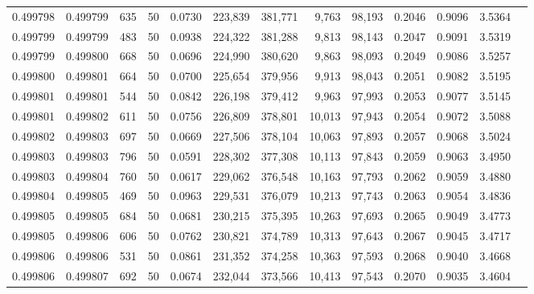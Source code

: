\begin{tabular}{rrrrrrrrrrrrr}
0.499798 & 0.499799 &   635 &  50 &                                     0.0730 & 223,839 & 381,771 &   9,763 &  98,193 & 0.2046 & 0.9096 & 3.5364 \\
0.499799 & 0.499799 &   483 &  50 &                                     0.0938 & 224,322 & 381,288 &   9,813 &  98,143 & 0.2047 & 0.9091 & 3.5319 \\
0.499799 & 0.499800 &   668 &  50 &                                     0.0696 & 224,990 & 380,620 &   9,863 &  98,093 & 0.2049 & 0.9086 & 3.5257 \\
0.499800 & 0.499801 &   664 &  50 &                                     0.0700 & 225,654 & 379,956 &   9,913 &  98,043 & 0.2051 & 0.9082 & 3.5195 \\
0.499801 & 0.499801 &   544 &  50 &                                     0.0842 & 226,198 & 379,412 &   9,963 &  97,993 & 0.2053 & 0.9077 & 3.5145 \\
0.499801 & 0.499802 &   611 &  50 &                                     0.0756 & 226,809 & 378,801 &  10,013 &  97,943 & 0.2054 & 0.9072 & 3.5088 \\
0.499802 & 0.499803 &   697 &  50 &                                     0.0669 & 227,506 & 378,104 &  10,063 &  97,893 & 0.2057 & 0.9068 & 3.5024 \\
0.499803 & 0.499803 &   796 &  50 &                                     0.0591 & 228,302 & 377,308 &  10,113 &  97,843 & 0.2059 & 0.9063 & 3.4950 \\
0.499803 & 0.499804 &   760 &  50 &                                     0.0617 & 229,062 & 376,548 &  10,163 &  97,793 & 0.2062 & 0.9059 & 3.4880 \\
0.499804 & 0.499805 &   469 &  50 &                                     0.0963 & 229,531 & 376,079 &  10,213 &  97,743 & 0.2063 & 0.9054 & 3.4836 \\
0.499805 & 0.499805 &   684 &  50 &                                     0.0681 & 230,215 & 375,395 &  10,263 &  97,693 & 0.2065 & 0.9049 & 3.4773 \\
0.499805 & 0.499806 &   606 &  50 &                                     0.0762 & 230,821 & 374,789 &  10,313 &  97,643 & 0.2067 & 0.9045 & 3.4717 \\
0.499806 & 0.499806 &   531 &  50 &                                     0.0861 & 231,352 & 374,258 &  10,363 &  97,593 & 0.2068 & 0.9040 & 3.4668 \\
0.499806 & 0.499807 &   692 &  50 &                                     0.0674 & 232,044 & 373,566 &  10,413 &  97,543 & 0.2070 & 0.9035 & 3.4604 \\

\end{tabular}
